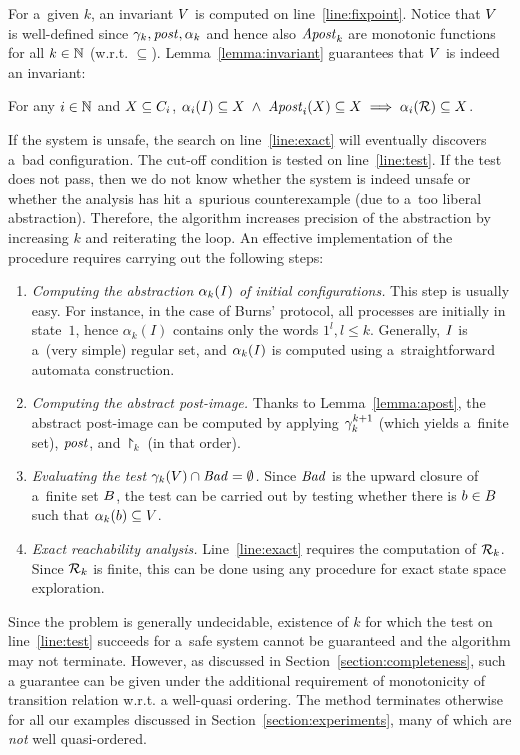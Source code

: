 For a~given $k$, an invariant $\Vk$ is computed on line~\ref{line:fixpoint}. 
Notice that $\Vk$ is well-defined since $\gammaof k,\post,\abstraction k$ and hence also $\apost k$ are monotonic functions for all $k\in\nat$ (w.r.t. $\subseteq$).
Lemma~\ref{lemma:invariant} guarantees that $\Vk$ is indeed an invariant:
\begin{lemma}
\label{lemma:invariant}
For any $i\in\nat$ and $X\subseteq\viewsof i$, $\projof{\inits}{i}\subseteq{X} \; \land \; \apostof{X}{i}\subseteq X\implies\projof{\reach}{i}\subseteq X$.  
\end{lemma}

If the system is unsafe, the search on line~\ref{line:exact} will eventually discovers a~bad configuration.
The cut-off condition is tested on line~\ref{line:test}.
If the test does not pass, then we do not know whether the system is indeed unsafe or whether the analysis has hit a~spurious counterexample (due to a~too liberal abstraction). Therefore, the algorithm increases precision of the abstraction by increasing $k$ and reiterating the loop. 
An effective implementation of the procedure requires carrying out the following steps:  
\begin{enumerate}
\item
{\it Computing the abstraction $\abstr k \inits$ of initial configurations.}
This step is usually easy. 
For instance, in the case of Burns' protocol, all processes are initially in state~$1$, hence $\alpha_k(I)$ contains only the words $1^l, l\leq k$.
Generally, $\inits$ is a~(very simple) regular set, and $\projof \inits k$ is computed using a~straightforward automata construction.  
\item
{\it Computing the abstract post-image.}
Thanks to Lemma~\ref{lemma:apost}, the abstract post-image can be computed by applying $\limgammaof k {k+1}$ (which yields a~finite set), $\post$, and $\project_k$ (in that order).
\item
{\it Evaluating the test $\gammaof k (\Vk)\cap\bad = \emptyset$.}
Since $\bad$ is the upward closure of a~finite set $\minbad$, the test can be carried out by testing whether there is $b\in\minbad$ such that  $\alpha_k(b)\subseteq \Vk$. 
\item
{\it Exact reachability analysis.}
Line~\ref{line:exact} requires the computation of $\reachof k$.
Since $\reachof k$ is finite, this can be done using any procedure for exact state space exploration. 
\end{enumerate}
%
Since the problem is generally undecidable, existence of $k$ for which
the test on line~\ref{line:test} succeeds for a~safe system cannot be
guaranteed and the algorithm may not terminate. However, as discussed
in Section~\ref{section:completeness}, such a guarantee can be given
under the additional requirement of monotonicity of transition
relation w.r.t. a well-quasi ordering.
%
The method terminates otherwise for all our examples discussed in
Section~\ref{section:experiments}, many of which are \emph{not} well
quasi-ordered.


